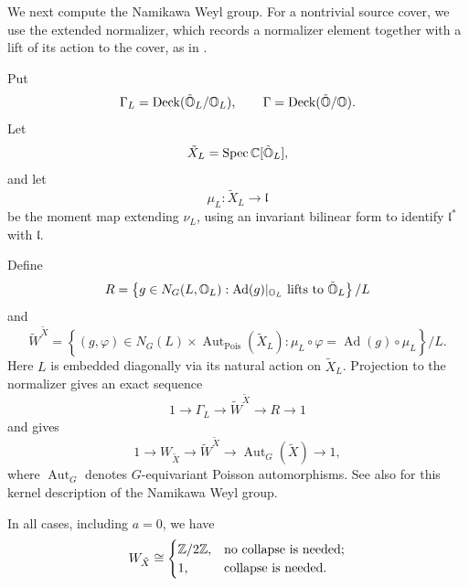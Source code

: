 We next compute the Namikawa Weyl group.
For a nontrivial source cover, we use the extended
normalizer, which records a normalizer element
together with a lift of its action to the cover, as in
\cite[Definition~3.33]{MMY2025}.

Put
\[
  \Gamma_L=
  \operatorname{Deck}(\tilde{\mathbb{O}}_L/\mathbb{O}_L),
  \qquad
  \Gamma=
  \operatorname{Deck}(\tilde{\mathbb{O}}/\mathbb{O}).
\]
Let
\[
  \tilde X_L=\operatorname{Spec}\mathbb C[\tilde{\mathbb{O}}_L],
\]
and let
\[
  \mu_L:\tilde X_L\longrightarrow\mathfrak l
\]
be the moment map extending $\nu_L$, using an
invariant bilinear form to identify
$\mathfrak l^*$ with $\mathfrak l$.

Define
\[
  R=
  \left\{
    g\in N_G(L,\mathbb{O}_L):
    \operatorname{Ad}(g)|_{\mathbb{O}_L}
    \text{ lifts to }\tilde{\mathbb{O}}_L
  \right\}/L
\]
and
\[
  \widetilde W^{\tilde X}
  =
  \left\{
    (g,\varphi)\in
    N_G(L)\times\operatorname{Aut}_{\mathrm{Pois}}(\tilde X_L):
    \mu_L\circ\varphi
    =
    \operatorname{Ad}(g)\circ\mu_L
  \right\}/L.
\]
Here $L$ is embedded diagonally via its natural
action on $\tilde X_L$.
Projection to the normalizer gives an exact sequence
\[
  1\longrightarrow\Gamma_L
  \longrightarrow\widetilde W^{\tilde X}
  \longrightarrow R
  \longrightarrow1
\]
and \cite[Theorem~3.34(iii)]{MMY2025} gives
\[
  1\longrightarrow W_{\tilde X}
  \longrightarrow\widetilde W^{\tilde X}
  \longrightarrow\operatorname{Aut}_G(\tilde X)
  \longrightarrow1,
\]
where $\operatorname{Aut}_G$ denotes
$G$-equivariant Poisson automorphisms.
See also \cite[Proposition~7.5(ii)]{LMM2026} for this kernel
description of the Namikawa Weyl group.

\begin{prop}
  In all cases, including $a=0$, we have
  \[
    W_{\tilde X}\cong
    \begin{cases}
      \mathbb{Z}/2\mathbb{Z},&\text{no collapse is needed};\\
      1,&\text{collapse is needed}.
    \end{cases}
  \]
\end{prop}

